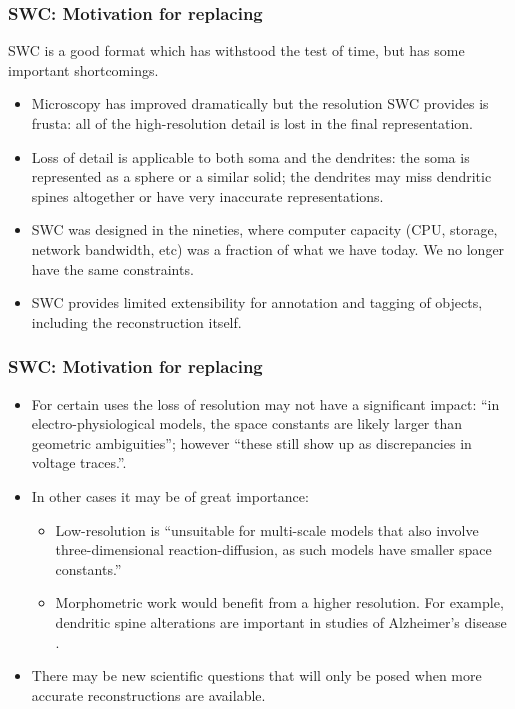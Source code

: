 \documentclass{beamer}
\begin{document}
\begin{frame}
\frametitle{SWC: Motivation for replacing}

SWC is a good format which has withstood the test of time, but has
some important shortcomings.
\pause

\begin{itemize}
\item Microscopy has improved dramatically but the resolution SWC
  provides is frusta: all of the high-resolution detail is lost in the
  final representation.
\pause
\item Loss of detail is applicable to both soma and the dendrites: the
  soma is represented as a sphere or a similar solid; the dendrites
  may miss dendritic spines altogether or have very inaccurate
  representations.
\pause
\item SWC was designed in the nineties, where computer capacity (CPU,
  storage, network bandwidth, etc) was a fraction of what we have
  today. We no longer have the same constraints.
\pause
\item SWC provides limited extensibility for annotation and tagging
  of objects, including the reconstruction itself.
\end{itemize}

\end{frame}

\begin{frame}
\frametitle{SWC: Motivation for replacing}

\begin{itemize}
\item For certain uses the loss of resolution may not have a
  significant impact: ``in electro-physiological models, the space
  constants are likely larger than geometric ambiguities''; however
  ``these still show up as discrepancies in voltage
  traces.''\cite{mcdougal2013water}.
\pause
\item In other cases it may be of great importance:
  \begin{itemize}
  \item Low-resolution is ``unsuitable for multi-scale models that
    also involve three-dimensional reaction-diffusion, as such models
    have smaller space constants.''\cite{mcdougal2013water}
  \pause
  \item Morphometric work would benefit from a higher resolution. For
    example, dendritic spine alterations are important in studies of
    Alzheimer's disease \cite{smith2009reversal}.
  \pause
  \end{itemize}
\item There may be new scientific questions that will only be posed
  when more accurate reconstructions are available.
\pause
\end{itemize}

\end{frame}
\end{document}

